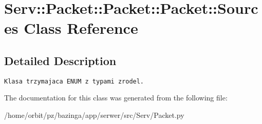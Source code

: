 \hypertarget{class_serv_1_1_packet_1_1_packet_1_1_sources}{
\section{Serv::Packet::Packet::Packet::Sources Class Reference}
\label{class_serv_1_1_packet_1_1_packet_1_1_sources}
}


\subsection{Detailed Description}


\footnotesize\begin{verbatim}Klasa trzymajaca ENUM z typami zrodel.\end{verbatim}
\normalsize
 

The documentation for this class was generated from the following file:\begin{CompactItemize}
\item 
/home/orbit/pz/bazinga/app/serwer/src/Serv/Packet.py\end{CompactItemize}

